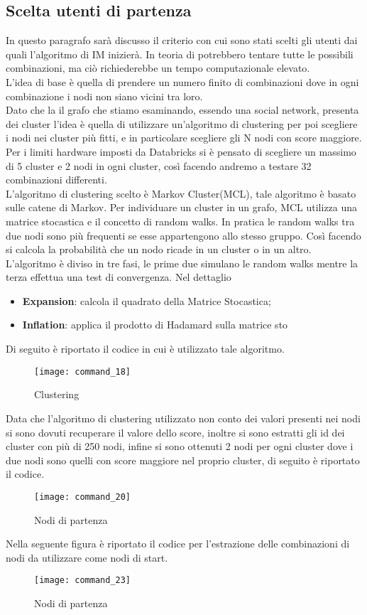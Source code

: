 \subsection{Scelta utenti di partenza}
In questo paragrafo sarà discusso il criterio con cui sono stati scelti gli utenti
dai quali l'algoritmo di IM inizierà. In teoria di potrebbero tentare tutte le
possibili combinazioni, ma ciò richiederebbe un tempo computazionale elevato.\\
L'idea di base è quella di prendere un numero finito di combinazioni dove in ogni
combinazione i nodi non siano vicini tra loro. \\
Dato che la il grafo che stiamo esaminando, essendo una social network,
presenta dei cluster l'idea è quella di utilizzare un'algoritmo
di clustering per poi scegliere i nodi nei cluster più fitti, e in particolare scegliere gli
N nodi con score maggiore. Per i limiti hardware imposti da Databricks si è pensato di
scegliere un massimo di 5 cluster e 2 nodi in ogni cluster, così facendo andremo a testare
32 combinazioni differenti.\\
L'algoritmo di clustering scelto è Markov Cluster(MCL), tale algoritmo è basato sulle
catene di Markov. Per individuare un cluster in un grafo, MCL utilizza una matrice stocastica
e il concetto di random walks. In pratica le random walks tra due nodi sono più frequenti se esse appartengono
allo stesso gruppo. Così facendo si calcola la probabilità che un nodo ricade in
un cluster o in un altro.\\
L'algoritmo è diviso in tre fasi, le prime due simulano le random walks mentre la terza effettua una test di
convergenza. Nel dettaglio
\begin{itemize}
  \item \textbf{Expansion}: calcola il quadrato della Matrice Stocastica;
	\item \textbf{Inflation}: applica il prodotto di Hadamard sulla matrice sto
\end{itemize}
Di seguito è riportato il codice in cui è utilizzato tale algoritmo.
\begin{figure}[!htbp]
  \texttt{[image: command\_18]}
  \caption{Clustering}
  \label{command_18}
\end{figure}
\clearpage
Data che l'algoritmo di clustering utilizzato non conto dei valori presenti nei
nodi si sono dovuti recuperare il valore dello score, inoltre si sono estratti gli
id dei cluster con più di 250 nodi, infine si sono ottenuti 2 nodi per ogni cluster
dove i due nodi sono quelli con score maggiore nel proprio cluster, di seguito è riportato il codice.
\begin{figure}[!htbp]
  \texttt{[image: command\_20]}
  \caption{Nodi di partenza}
  \label{command_20}
\end{figure}
Nella seguente figura è riportato il codice per l'estrazione delle combinazioni di
nodi da utilizzare come nodi di start.
\begin{figure}[!htbp]
  \texttt{[image: command\_23]}
  \caption{Nodi di partenza}
  \label{command_23}
\end{figure}
\clearpage

